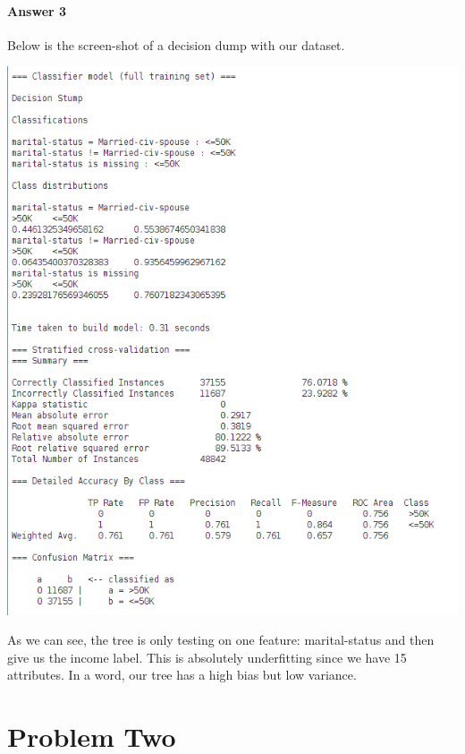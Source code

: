 \documentclass[paper=a4, fontsize=11pt]{scrartcl} %
\numberwithin{equation}{section} %
\numberwithin{figure}{section} %
\numberwithin{table}{section} %
\begin{document}
\paragraph{Answer 3}
Below is the screen-shot of a decision dump with our dataset. 
\begin{center}
\includegraphics[scale=0.6]{question3.png}\label{Summary for a decision dump tree} \\
\end{center}
As we can see, the tree is only testing on one feature: marital-status and then give us the income label. This is absolutely underfitting since we have 15 attributes. In a word, our tree has a high bias but low variance. 


\section{Problem Two}
\end{document}
